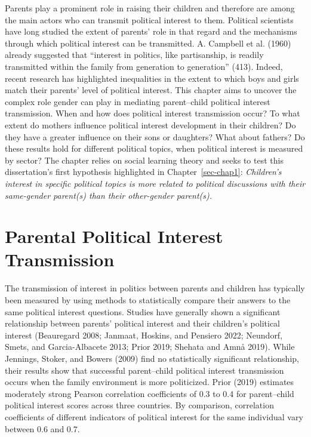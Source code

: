 \documentclass[
  letterpaper,
  DIV=11,
  numbers=noendperiod]{scrreprt}
\begin{document}
Parents play a prominent role in raising their children and therefore
are among the main actors who can transmit political interest to them.
Political scientists have long studied the extent of parents' role in
that regard and the mechanisms through which political interest can be
transmitted. A. Campbell et al. (1960) already suggested that ``interest
in politics, like partisanship, is readily transmitted within the family
from generation to generation'' (413). Indeed, recent research has
highlighted inequalities in the extent to which boys and girls match
their parents' level of political interest. This chapter aims to uncover
the complex role gender can play in mediating parent--child political
interest transmission. When and how does political interest transmission
occur? To what extent do mothers influence political interest
development in their children? Do they have a greater influence on their
sons or daughters? What about fathers? Do these results hold for
different political topics, when political interest is measured by
sector? The chapter relies on social learning theory and seeks to test
this dissertation's first hypothesis highlighted in
Chapter~\ref{sec-chap1}: \emph{Children's interest in specific political
topics is more related to political discussions with their same-gender
parent(s) than their other-gender parent(s).}

\section{Parental Political Interest
Transmission}\label{parental-political-interest-transmission}

The transmission of interest in politics between parents and children
has typically been measured by using methods to statistically compare
their answers to the same political interest questions. Studies have
generally shown a significant relationship between parents' political
interest and their children's political interest (Beauregard 2008;
Janmaat, Hoskins, and Pensiero 2022; Neundorf, Smets, and
Garcia-Albacete 2013; Prior 2019; Shehata and Amnå 2019). While
Jennings, Stoker, and Bowers (2009) find no statistically significant
relationship, their results show that successful parent--child political
interest transmission occurs when the family environment is more
politicized. Prior (2019) estimates moderately strong Pearson
correlation coefficients of 0.3 to 0.4 for parent--child political
interest scores across three countries. By comparison, correlation
coefficients of different indicators of political interest for the same
individual vary between 0.6 and 0.7.
\end{document}
